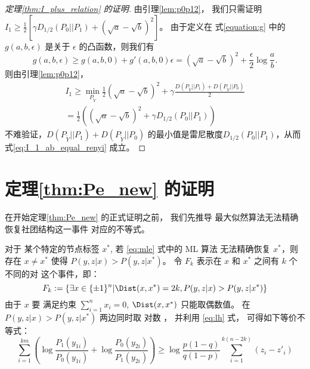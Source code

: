\begin{proof}[定理\ref{thm:I_plus_relation} 的证明]
    由引理\ref{lem:p0p12}，
    我们只需证明 $I_1 \geq \frac{1}{2}[\gamma D_{1/2}(P_0||P_1)
    + (\sqrt{a} - \sqrt{b})^2]$。
    由于定义在 式\eqref{equation:g} 中的 $g(a,b,\epsilon)$ 是关于 $\epsilon$
    的凸函数，则我们有
    \begin{equation}\label{eq:g_linear}
            g(a,b,\epsilon) \geq g(a,b,0) + g'(a,b,0)\epsilon = (\sqrt{a} - \sqrt{b})^2 + \frac{\epsilon}{2}\log \frac{a}{b}. 
        \end{equation}
        则由引理\ref{lem:p0p12}，
        \begin{align}
            I_1 \geq \min_{P_{\widetilde{Y}}}
            \frac{1}{2}(\sqrt{a}-\sqrt{b})^2+\gamma
            \frac{D(P_{\widetilde{Y}} || P_1) + D(P_{\widetilde{Y}} || P_0)}{2} \\
            = \frac{1}{2}((\sqrt{a}-\sqrt{b})^2+\gamma D_{1/2}(P_0||P_1))
            \label{eq:I_1_ab_equal_renyi}
        \end{align}
        不难验证，$D(P_{\widetilde{Y}} || P_1) + D(P_{\widetilde{Y}} || P_0)$
        的最小值是雷尼散度$D_{1/2}(P_0||P_1)$，从而
        式\eqref{eq:I_1_ab_equal_renyi} 成立。
\end{proof}
\section{定理\ref{thm:Pe_new} 的证明}

在开始定理\ref{thm:Pe_new} 的正式证明之前，
我们先推导
最大似然算法无法精确恢复社团结构这一事件
对应的不等式。

对于
某个特定的节点标签
$x^*$,
若
\eqref{eq:mle} 式中的 ML 算法
无法精确恢复 
$x^*$，则
存在 $x\neq x^*$ 使得 $P(y,z|x) > P(y,z|x^*)$。
令 $F_k$ 表示在 $x$ 和 $x^*$ 之间有 $k$ 个不同的对
这个事件，即：
    \begin{equation}\label{eq:Fk}
    F_k:=\{\exists x \in \{\pm 1\}^n |
    \Dist(x, x^*)=2k,
    P(y,z|x) > 
    P(y,z|x^*) \}
    \end{equation}
    由于
    $x$ 要 满足约束
    $\sum_{i=1}^n x_i=0$,
    $\Dist(x, x^*)$
    只能取偶数值。
    在
    $P(y,z|x) > P(y,z|x^*)$
    两边同时取
    对数
    ， 并利用
    \eqref{eq:lh} 式，
    可得如下等价不等式：
    \begin{equation}\label{eq:ein}
    \sum_{i=1}^{km}
    \left(\log \frac{P_1(y_{1i})}
    {P_0(y_{1i})}
    + \log \frac{P_0(y_{2i})}
    {P_1(y_{2i})}
    \right)
    \geq \log \frac{p(1-q)}{q(1-p)} \sum_{i=1}^{k(n-2k)}(z_{i} - z'_{i})
    \end{equation}
    
